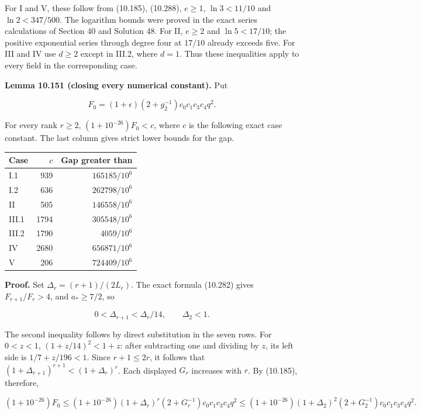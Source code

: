 \documentclass[
  11pt,
  a4paper,
]{article}
\newcounter{none} %
\begin{document}
For I and V, these follow from (10.185), (10.288), \(e\ge1\),
\(\ln3<11/10\) and \(\ln2<347/500\). The logarithm bounds were proved in
the exact series calculations of Section 40 and Solution 48. For II,
\(e\ge2\) and \(\ln5<17/10\); the positive exponential series through
degree four at \(17/10\) already exceeds five. For III and IV use
\(d\ge2\) except in III.2, where \(d=1\). Thus these inequalities apply
to every field in the corresponding case.

\textbf{Lemma 10.151 (closing every numerical constant).} Put

\[
F_0=(1+\epsilon)(2+g_2^{-1})c_0c_1c_3c_4q^2.
\tag{10.444}
\]

For every rank \(r\ge2\), \((1+10^{-26})F_0<c\), where \(c\) is the
following exact case constant. The last column gives strict lower bounds
for the gap.

{\def\LTcaptype{none} %
\begin{longtable}[]{@{}lrr@{}}
\toprule\noalign{}
Case & \(c\) & Gap greater than \\
\midrule\noalign{}
\endhead
\bottomrule\noalign{}
\endlastfoot
I.1 & 939 & \(165185/10^6\) \\
I.2 & 636 & \(262798/10^6\) \\
II & 505 & \(146558/10^6\) \\
III.1 & 1794 & \(305548/10^6\) \\
III.2 & 1790 & \(4059/10^6\) \\
IV & 2680 & \(656871/10^6\) \\
V & 206 & \(724409/10^6\) \\
\end{longtable}
}

\textbf{Proof.} Set \(\Delta_r=(r+1)/(2L_r)\). The exact formula
(10.282) gives \(F_{r+1}/F_r>4\), and \(a_*\ge7/2\), so

\[
0<\Delta_{r+1}<\Delta_r/14,\qquad \Delta_2<1.
\tag{10.445}
\]

The second inequality follows by direct substitution in the seven rows.
For \(0<z<1\), \((1+z/14)^2<1+z\): after subtracting one and dividing by
\(z\), its left side is \(1/7+z/196<1\). Since \(r+1\le2r\), it follows
that \((1+\Delta_{r+1})^{r+1}<(1+\Delta_r)^r\). Each displayed \(G_r\)
increases with \(r\). By (10.185), therefore,

\[
(1+10^{-26})F_0
\le (1+10^{-26})(1+\Delta_r)^r
       (2+G_r^{-1})c_0c_1c_3c_4q^2
\le (1+10^{-26})(1+\Delta_2)^2
       (2+G_2^{-1})c_0c_1c_3c_4q^2.
\tag{10.446}
\]
\end{document}
